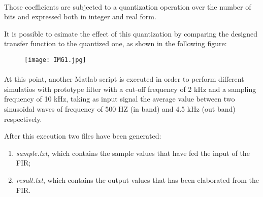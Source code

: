 \paragraph{}
Those coefficients are subjected to a quantization operation over the number of bits and expressed both in integer and real form.

It is possible to esimate the effect of this quantization by comparing the designed transfer function to the quantized one, as shown in the following figure: %
\begin{figure}[!ht]
	\texttt{[image: IMG1.jpg]}
	\centering
\end{figure}

\paragraph{}
At this point, another Matlab script is executed in order to perform
different simulatios with prototype filter with a cut-off frequency of 2 kHz and a sampling frequency of 10 kHz, taking as 
input signal the average value between two sinusoidal waves of frequency of 500 HZ (in band) and 4.5 kHz (out band) respectively.

After this execution two files have been generated:

\begin{enumerate}
	\item \emph{sample.txt}, which contains the sample values that have fed the input of the FIR;
	\item \emph{result.txt}, which contains the output values that has been elaborated from the FIR.
\end{enumerate}


